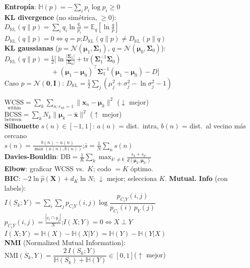 \documentclass[10pt, a4paper]{article}
\newcommand{\x}{\mathbf{x}}
\newcommand{\X}{\mathbf{X}}
\newcommand{\muu}{\boldsymbol{\mu}}
\newcommand{\Sig}{\boldsymbol{\Sigma}}
\begin{document}
\begin{minipage}[t]{0.3299\textwidth}
\begin{tcolorbox}[formulabox=Information Theory, colframe=softTeal]
    \textbf{Entropía}: $\mathbb{H}(p) = -\sum_i p_i\log p_i \geq 0$\\
    \textbf{KL divergence} (no simétrica, $\geq 0$):\\
    $D_\mathbb{KL}(q\|p) = \sum_i q_i\ln\tfrac{q_i}{p_i} = \mathbb{E}_q\!\left[\ln\tfrac{q}{p}\right]$\\
    $D_\mathbb{KL}(q\|p)=0 \Leftrightarrow q=p$;\quad $D_\mathbb{KL}(q\|p)\neq D_\mathbb{KL}(p\|q)$\\[2pt]
    \textbf{KL gaussianas} ($p=\mathcal{N}(\muu_1,\Sig_1)$, $q=\mathcal{N}(\muu_0,\Sig_0)$):\\
    $D_\mathbb{KL}(q\|p)=\tfrac{1}{2}\!\big[\ln\tfrac{|\Sig_1|}{|\Sig_0|}+\text{tr}(\Sig_1^{-1}\Sig_0)$ \\ 
    $\phantom{D_\mathbb{KL}(q\|p)=}+(\muu_1{-}\muu_0)^\top\Sig_1^{-1}(\muu_1{-}\muu_0)-D\big]$\\
    Caso $p=\mathcal{N}(\mathbf{0},\mathbf{I})$: $D_\mathbb{KL}=\tfrac{1}{2}\sum_j(\mu_j^2+\sigma_j^2-\ln\sigma_j^2-1)$\\[2pt]
\end{tcolorbox}

\begin{tcolorbox}[formulabox=Métricas de Clustering, colframe=softGreen]
    $\underset{\text{within}}{\text{WCSS}} = \sum_k\sum_{n:r_{nk}=1}\|\x_n-\muu_k\|^2$ ($\downarrow$ mejor)\\
    $\underset{\text{between}}{\text{BCSS}} = \sum_k N_k\|\muu_k-\bar{\x}\|^2$ ($\uparrow$ mejor)\\[2pt]
    \textbf{Silhouette} $s(n)\in[-1,1]$: $a(n)$ = dist.\ intra, $b(n)$ = dist.\ al vecino más cercano\\
    $s(n)=\tfrac{b(n)-a(n)}{\max(a(n),b(n))}$;\quad $\bar{s}=\tfrac{1}{N}\sum_n s(n)$\\[2pt]
    \textbf{Davies-Bouldin}: $\text{DB}=\tfrac{1}{K}\sum_k\max_{k'\neq k}\tfrac{s_k+s_{k'}}{d(\muu_k,\muu_{k'})}$\\
    \textbf{Elbow}: graficar WCSS vs.\ $K$; codo $= K$ óptimo.\\
    \textbf{BIC}: $-2\ln\hat{p}(\X) + d_K\ln N$; $\downarrow$ mejor; selecciona $K$.
    \textbf{Mutual. Info} (con labels):\\
    $I(S_k;Y)=\sum_i\sum_j p_{C_iY}(i,j)\log\dfrac{p_{C_iY}(i,j)}{p_{C_i}(i)\,p_Y(j)}$\\
    $p_{C_iY}(i,j)=\tfrac{|c_i\cap y_j|}{N}$;\quad $I(X;Y)=0\Leftrightarrow X\perp Y$\\
    $I(X;Y)=\mathbb{H}(X)-\mathbb{H}(X|Y)=\mathbb{H}(Y)-\mathbb{H}(Y|X)$\\[2pt]
    \textbf{NMI} (Normalized Mutual Information):\\
    $\text{NMI}(S_k,Y)=\dfrac{2\,I(S_k;Y)}{\mathbb{H}(S_k)+\mathbb{H}(Y)}\in[0,1]$\quad($\uparrow$ mejor)
\end{tcolorbox}


\end{minipage}
\end{document}
